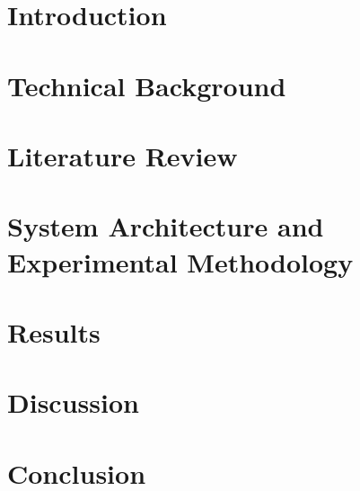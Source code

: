 \section{Introduction}
\label{sec:introduction}

\thispagestyle{empty}



\clearpage

\section{Technical Background}




\label{sec:technical_bg}


\clearpage

\section{Literature Review}
\label{sec:literature-review}



\clearpage

\section{System Architecture and Experimental Methodology}
\label{sec:methods}


\clearpage

\section{Results}
\label{sec:results}


\clearpage

\section{Discussion}
\label{sec:discussion}


\clearpage

\section{Conclusion}
\label{sec:conclusion}


